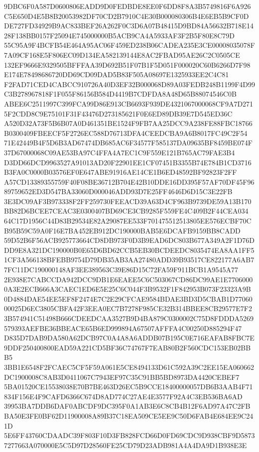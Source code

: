 \documentclass[UTF8,fontset=fandol,zihao=-4,a4paper]{ctexart}
\begin{document}
{{9DBC6F0A587D0600806EADD9D0FEDBDE8EE0F6DD8F8A3B5749816F6A926C5E650D4E5B8B20053982DF70CD2B7910C4E30B000080306B4E6EB5B9CF0D
DE727FD34929B9AC833BEF26A262F0C3D6A07B48415D9BD84A56632B718E1428F138BB0157F25094E745000000B5ACB9CA4A5933AF3F2B5F80E8C79D
55C95A9F4BCFB54E464A95AC06F459ED238B06CADEA235E3CE00008035078F7A09CF168E5F806EC09D134EA582139144E8AC2FBAD95AE26C2C0505CE
132EF9666E9329505BFFFAA39D692B51F07B1F5D051F000020C60B6266D7F98E174E78498686720DD69CD09DAD5B83F505A08697E1325933EE2C4C81
F2FAD71CED4CABCC910726A40D3EF32B000068D89A03FEDB248B1199F4D99C3B278967818F1F055F86156B584D4419B7CDFDA8A48D65B88074546C0B
ABEE6C2511997C399FCA99D86E913CB6693F939DE4321067000068CF9A7D2715F2CDD8C9E75101F31F43476D273185621F0E6ED89DB39E7D545ED36C
A520D32A73F5B6B07A0D461351BE1524F9FB7AA25DCC9A238FE88FBC18766B0300409FBEECF5F2726EC588D76713DFA4CEEDCBA9A6B8017FC49C2F54
71E42449B4F5D6B3AD67474DB685AC6F34577F585137DA09635BF8459BE074F37D67000068C09AE53BA97C4FFA4A7EC1C9F559E121B765AC79FAE3B4
D3DD66DCD9963527A91013AD20F22901EE1CF07451B3355B74E784B1CD3716B3FA0C0000B03576EF0E647ABE91916AE14CE1B6ED48592BF92823F2FF
A57CD13389355759F40F08BE36712B704E42B10DDE16DD395F57AF70DF45F9689759652ED3D547BA33060D000046ADD93D7E25FF4646D6D15C3E22FB
3E3DC09AF3B973338F2FF259730FEEACD39A63D4CF963B9739DE59A13B170BB82D6BCEE7CEAC3E0300407BD69CE3CB9285F559FE4C409B2F44CEA034
64C17D1956C44D83B29534E82A29087EE533F701475512513805EE576ECBF70CB95B59C59A0F16E7BA452EB912DC190000BAB5E6DCAFB9159BB8CADD
59D52B6F56ACB925773664CD8DB973F0D3B9EAD6DC803B677A349A2F1D76DDD9E8A321DC190000B0E65D6BD62CCB5EB30BCDEEDC8035474EA8AA1FF5
1CF3A566138BFEBB9754D79DB35AB3AA27480ADD39B93517CE822177A6AB77FC11DC190000148AF3EE389563C39E86D15C72FA59F911BCB1A9545A77
2E938E7CABCCDA942DCC9DB1E6EAEE5C6C503067CD86DC99AE1E77060000A3E2ECB666A3CAEC1ED6E5E25C6C044F3B9532F1F842953B073F23323A9B
0D4884DAE54EE5EF8F2474E7C2E29CFCAE9584BDAE3BD3D5CBAB1D7706000025D6EC3805CBFA42F3EEA0EC7B7278F985CE32B314BBEE8CB29577E7F2
3B574941C51498B666CDEEDCAA3527B9D4BA879C0300002C75D8FDDDA5269579393AEFBE36BBEACE65B6ED999894A67507AFFFA4C00250D885294F47
D835D7DAB9DA580A62DCB97C0A4A8A6ADDB07B195C0E716EAFAB8FBC7E9DDF250400800EAD59A221CD5BF36C74767F7EAB80B2F560CDC153EB02BBB5
3BB1E6548F2FCAEC5CF5F59A061E5CE8494133D61C592A39C2EE15EA060662DC1900008C8AB3D0411067C7943EF97C35C91BB5BD8973DA4420CEBEF7
5BA01520CE15538038E70B7BE463D26EC5B9CCE18400000057DB6B3AAB4F71834F156E4F9CAFD6366C674D8AD774C27AE4E3577F92A4C3EB536BA6AD
39953BA7DDB6DAF0ABCDF9DC395F0A1AB3E6C8CB4B12F6AD97A47C2FBBA50E3FE0BF62D11900008A89B37C18EA509CE5EE9C50D6FAB4E684EE9C241D
5E6FF43760CDAADC39F803F10D3FB828FCD66D0FD69CDC9D938CBF9D58737277663A070000E5C5D97D28560FE25CD79D23ADB981A4A4DA9D1B938E3E
}}
\end{document}
